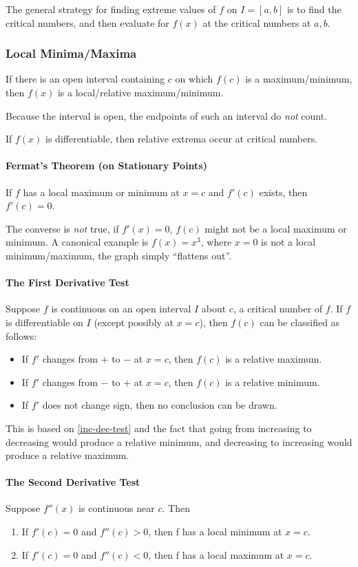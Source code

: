 \documentclass{article}
\begin{document}
The general strategy for finding extreme values of $f$ on $I = [a,b]$ is to find the critical numbers, and then evaluate for $f(x)$ at the critical numbers at $a,b$.

\subsubsection{Local Minima/Maxima}
If there is an open interval containing $c$ on which $f(c)$ is a maximum/minimum, then $f(x)$ is a local/relative maximum/minimum.

Because the interval is open, the endpoints of such an interval do \emph{not} count.

If $f(x)$ is differentiable, then relative extrema occur at critical numbers.

\paragraph{Fermat's Theorem (on Stationary Points)}
If $f$ has a local maximum or minimum at $x=c$ and $f'(c)$ exists, then $f'(c)=0$.

The converse is \emph{not} true, if $f'(x) = 0$, $f(c)$ might not be a local maximum or minimum. A canonical example is $f(x) = x^3$, where $x=0$ is not a local minimum/maximum, the graph simply ``flattens out''.

\paragraph{The First Derivative Test} Suppose $f$ is continuous on an open interval $I$ about $c$, a critical number of $f$. If $f$ is differentiable on $I$ (except possibly at $x=c$), then $f(c)$ can be classified as follows:
\begin{itemize}
    \item If $f'$ changes from $+$ to $-$ at $x=c$, then $f(c)$ is a relative maximum.
    \item If $f'$ changes from $-$ to $+$ at $x=c$, then $f(c)$ is a relative minimum.
    \item If $f'$ does not change sign, then no conclusion can be drawn.
\end{itemize}

This is based on \ref{inc-dec-test} and the fact that going from increasing to decreasing would produce a relative minimum, and decreasing to increasing would produce a relative maximum.

\paragraph{The Second Derivative Test} Suppose $f''(x)$ is continuous near $c$. Then \begin{enumerate}
    \item If $f'(c) = 0$ and $f''(c) > 0$, then f has a local minimum at $x=c$.
    \item If $f'(c) = 0$ and $f''(c) < 0$, then f has a local maximum at $x=c$.
\end{enumerate}
\end{document}
